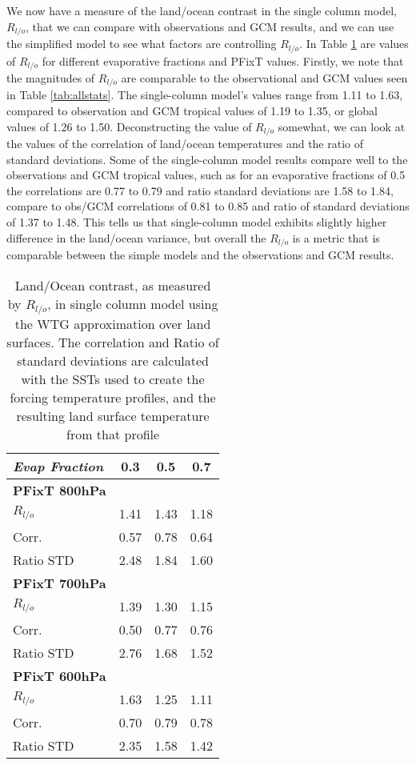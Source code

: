 We now have a measure of the land/ocean contrast in the single column model, 
$R_{l/o}$, that we can compare with observations and GCM results, and we can use 
the simplified model to see what factors are controlling $R_{l/o}$. In Table 
\ref{tab:scmrlo} are values of $R_{l/o}$ for different evaporative fractions and 
PFixT values. Firstly, we note that the magnitudes of $R_{l/o}$ are comparable 
to the observational and GCM values seen in Table \ref{tab:allstats}. The 
single-column model's values range from 1.11 to 1.63, compared to observation 
and GCM tropical values of 1.19 to 1.35, or global values of 1.26 to 1.50.  
Deconstructing the value of $R_{l/o}$ somewhat, we can look at the values of the 
correlation of land/ocean temperatures and the ratio of standard deviations.  
Some of the single-column model results compare well to the observations and GCM 
tropical values, such as for an evaporative fractions of 0.5 the correlations 
are 0.77 to 0.79 and ratio standard deviations are 1.58 to 1.84, compare to 
obs/GCM correlations of 0.81 to 0.85 and ratio of standard deviations of 1.37 to 
1.48. This tells us that single-column model exhibits slightly higher difference 
  in the land/ocean variance, but overall the $R_{l/o}$ is a metric that is 
  comparable between the simple models and the observations and GCM results.

\begin{center}
	\begin{table}[ht]
		\caption{Land/Ocean contrast, as measured by $R_{l/o}$, in single column 
		model using the WTG approximation over land surfaces. The correlation 
	and Ratio of standard deviations are calculated with the SSTs used to create 
the forcing temperature profiles, and the resulting land surface temperature  
from that profile}

		\label{tab:scmrlo}
		\scriptsize
	\begin{tabular}{ l  c  c  c }
		\textit{Evap Fraction}		& 0.3   & 0.5  & 0.7 \\ \hline
		\textbf{PFixT 800hPa}\\%
		$R_{l/o}$  							& 1.41  & 1.43 & 1.18\\ %
	Corr.							& 0.57  & 0.78 & 0.64\\ %
	Ratio STD           			& 2.48  & 1.84 & 1.60\\ \hline
		\textbf{PFixT 700hPa}\\%
		$R_{l/o}$  							& 1.39  & 1.30 & 1.15\\ %
	Corr.							& 0.50  & 0.77 & 0.76\\ %
	Ratio STD           			& 2.76  & 1.68 & 1.52\\ \hline
		\textbf{PFixT 600hPa}\\%
		$R_{l/o}$  							& 1.63  & 1.25 & 1.11\\ %
	Corr.							& 0.70  & 0.79 & 0.78\\ %
	Ratio STD           			& 2.35  & 1.58 & 1.42\\ \hline
	\end{tabular}
	\end{table}
\end{center}


